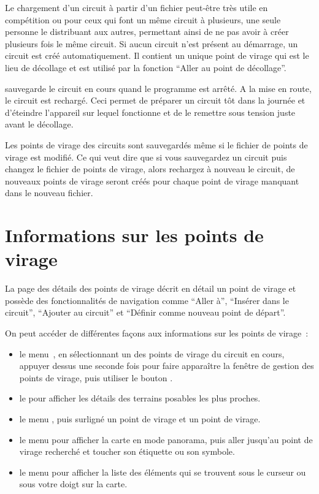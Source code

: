 Le chargement d'un circuit à partir d'un fichier peut-être très utile en compétition ou pour ceux 
qui font un même circuit à plusieurs, une seule personne le 
distribuant aux autres, permettant ainsi de ne pas avoir à créer plusieurs fois le même circuit.
\tip{}
Si aucun circuit n'est présent au démarrage, un circuit est créé automatiquement.
Il contient un unique point de virage qui est le lieu de décollage et est utilisé par la fonction ``Aller au point de décollage''.

\xc{} sauvegarde le circuit en cours quand le programme est arrêté. A la mise en route,
le circuit est rechargé. Ceci permet de préparer un circuit tôt dans la journée et d'éteindre l'appareil sur lequel \xc{} fonctionne
et de le remettre sous tension juste avant le décollage.

Les points de virage des circuits sont sauvegardés même si le fichier de
points de virage est modifié. Ce qui veut dire que si vous sauvegardez un circuit puis changez le
fichier de points de virage, alors rechargez à nouveau le circuit, de nouveaux points de virage seront créés
pour chaque point de virage manquant dans le nouveau fichier.

\section{Informations sur les points de virage}

La page des détails des points de virage décrit en détail un point de virage et possède
des fonctionnalités de navigation comme ``Aller à'', ``Insérer dans le circuit'', ``Ajouter au circuit'' et ``Définir comme nouveau point de départ''.

On peut accéder de différentes façons aux informations sur les points de virage~:
\begin{itemize}
\item
{} le menu~\blink{},
en sélectionnant un des points de virage du circuit en cours, appuyer dessus une seconde fois pour faire apparaître la fenêtre de gestion des points de virage, puis utiliser le bouton  .

\item
{} le \blink{} 
pour afficher les
détails des terrains posables les plus proches.

\item
{} le menu \blink{}, puis surligné un point de virage
et  un point de virage.

\item
{} le menu \blink{} pour afficher la
carte en mode panorama, puis aller jusqu'au point de virage recherché et toucher son étiquette ou son
symbole.

\item
{}  le menu \blink{}
pour afficher la
liste des éléments qui se trouvent sous le curseur ou sous votre doigt sur la carte.

\end{itemize}

